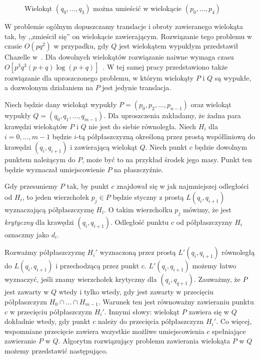 \begin{figure}[htb]
  \caption{Wielokąt $(q_0, \ldots, q_3)$ można umieścić w wielokącie
    $(p_0, \ldots, p_4)$\label{img:containment1}}
\end{figure}

W problemie ogólnym dopuszczamy translacje i obroty zawieranego
wielokąta tak, by ,,zmieścił się'' on wielokącie
zawierającym. Rozwiązanie tego problemu w czasie $O(pq^2)$ w
przypadku, gdy $Q$ jest wielokątem wypukłym przedstawił Chazelle
w~\cite{Chazelle83}. Dla dowolnych wielokątów rozwiązanie naiwne
wymaga czasu $O[p^3q^3(p + q) \log{(p + q)}]$~\cite{Chazelle83}. W tej
samej pracy przedstawiono także rozwiązanie dla uproszczonego
problemu, w którym wielokąty $P$ i $Q$ są wypukłe, a dozwolonym
działaniem na $P$ jest jedynie translacja.

Niech będzie dany wielokąt wypukły $P = (p_0, p_2, \ldots, p_{n-1})$
oraz wielokąt wypukły $Q = (q_0, q_1, \ldots, q_{m-1})$. Dla
uproszczenia zakładamy, że żadna para krawędzi wielokątów $P$ i $Q$
nie jest do siebie równoległa. Niech $H_i$ dla $i = 0, \ldots, m - 1$
będzie $i$-tą półpłaszczyzną określoną przez prostą współliniową do
krawędzi $(q_i, q_{i+1})$ i zawierającą wielokąt $Q$. Niech punkt $c$
będzie dowolnym punktem należącym do $P$, może być to na przykład
środek jego masy. Punkt ten będzie wyznaczał umiejscowienie $P$ na
płaszczyźnie.

Gdy przesuniemy $P$ tak, by punkt $c$ znajdował się w jak najmniejszej
odległości od $H_i$, to jeden wierzchołek $p_j \in P$ będzie styczny z
prostą $L(q_i, q_{i+1})$ wyznaczającą półpłaszczyznę $H_i$. O takim
wierzchołku $p_j$ mówimy, że jest \emph{krytyczny} dla krawędzi $(q_i,
q_{i+1})$. Odległość punktu $c$ od półpłaszczyzny $H_i$ oznaczmy jako
$d_i$.

Rozważmy półpłaszczyznę $H_i'$ wyznaczoną przez prostą
$L'(q_i,q_{i+1})$ równoległą do $L(q_i, q_{i+1})$ i przechodzącą przez
punkt $c$. $L'(q_i,q_{i+1})$ możemy łatwo wyznaczyć, jeśli znamy
wierzchołek krytyczny dla $(q_i, q_{q+1})$. Zauważmy, że $P$ jest
zawarty w $Q$ wtedy i tylko wtedy, gdy jest zawarty w przecięciu
półpłaszczyzn $H_0 \cap \ldots \cap H_{m-1}$. Warunek ten jest
równoważny zawieraniu punktu $c$ w przecięciu półpłaszczyzn
$H_i'$. Innymi słowy: wielokąt $P$ zawiera się w $Q$ dokładnie wtedy,
gdy punkt $c$ należy do przecięcia półpłaszczyzn $H_i'$. Co więcej,
wspomniane przecięcie zawiera wszystkie możliwe umiejscowienia $c$
spełniające zawieranie $P$ w $Q$. Algorytm rozwiązujący problemu
zawierania wielokąta $P$ w $Q$ możemy przedstawić następująco.

